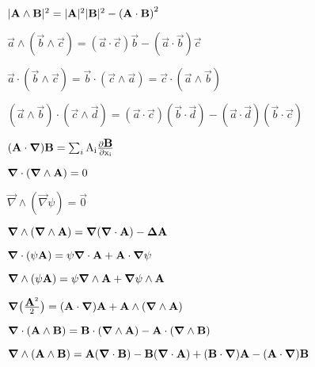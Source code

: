 \squishlist

\item $|\vec{\rm{A}} \wedge \vec{\rm{B}}|^2 = |\vec{\rm{A}}|^2|\vec{\rm{B}}|^2 - \left(\vec{\rm{A}}\cdot\vec{\rm{B}}\right)^2 $

\item $\vec{a} \wedge (\vec{b} \wedge \vec{c}) = (\vec{a} \cdot \vec{c})\vec{b} - (\vec{a} \cdot \vec{b})\vec{c}$

\item $\vec{a}\cdot(\vec{b}\wedge\vec{c})=\vec{b}\cdot(\vec{c}\wedge\vec{a})=\vec{c}\cdot(\vec{a}\wedge\vec{b})$

\item $(\vec{a} \wedge \vec{b}) \cdot (\vec{c} \wedge \vec{d}) = (\vec{a}\cdot\vec{c})(\vec{b}\cdot\vec{d}) - (\vec{a}\cdot\vec{d})(\vec{b}\cdot\vec{c})$

\item $(\vec{\rm{A}} \cdot \vec \nabla)\vec{\rm{B}} = \sum_{i} \rm{A}_i\frac{\partial \vec{\rm{B}}}{\partial x_i}$

\item $\vec{\nabla}\cdot (\vec{\nabla}\wedge\vec{\rm{A}})=0$

\item $\vec{\nabla} \wedge (\vec{\nabla}\psi)=\vec{0}$

\item $\vec{\nabla} \wedge (\vec{\nabla} \wedge \vec{\rm{A}}) = \vec{\nabla} (\vec{\nabla} \cdot \vec{\rm{A}}) - \vec \Delta \vec{\rm{A}}$

\item $\vec{\nabla} \cdot (\psi\vec{\rm{A}}) = \psi\vec{\nabla}\cdot\vec{\rm{A}} + \vec{\rm{A}}\cdot\vec{\nabla}\psi$

\item $\vec{\nabla} \wedge (\psi\vec{\rm{A}}) = \psi \vec{\nabla} \wedge \vec{\rm{A}} + \vec{\nabla}\psi \wedge \vec{\rm{A}}$

\item $\vec \nabla \big( \frac{\vec{\rm{A}}^2}{2} \big) = (\vec{\rm{A}} \cdot \vec \nabla)\vec{\rm{A}} + \vec{\rm{A}} \wedge (\vec \nabla \wedge \vec{\rm{A}})$

\item $\vec \nabla \cdot (\vec{\rm{A}} \wedge \vec{\rm{B}}) = \vec{\rm{B}} \cdot (\vec \nabla \wedge \vec{\rm{A}}) - \vec{\rm{A}} \cdot (\vec \nabla \wedge \vec{\rm{B}})$

\item $\vec \nabla \wedge (\vec{\rm{A}} \wedge \vec{\rm{B}}) = \vec{\rm{A}} (\vec \nabla \cdot \vec{\rm{B}}) - \vec{\rm{B}} (\vec \nabla \cdot \vec{\rm{A}}) + (\vec{\rm{B}} \cdot \vec \nabla)\vec{\rm{A}} - (\vec{\rm{A}} \cdot \vec \nabla)\vec{\rm{B}}$ 

